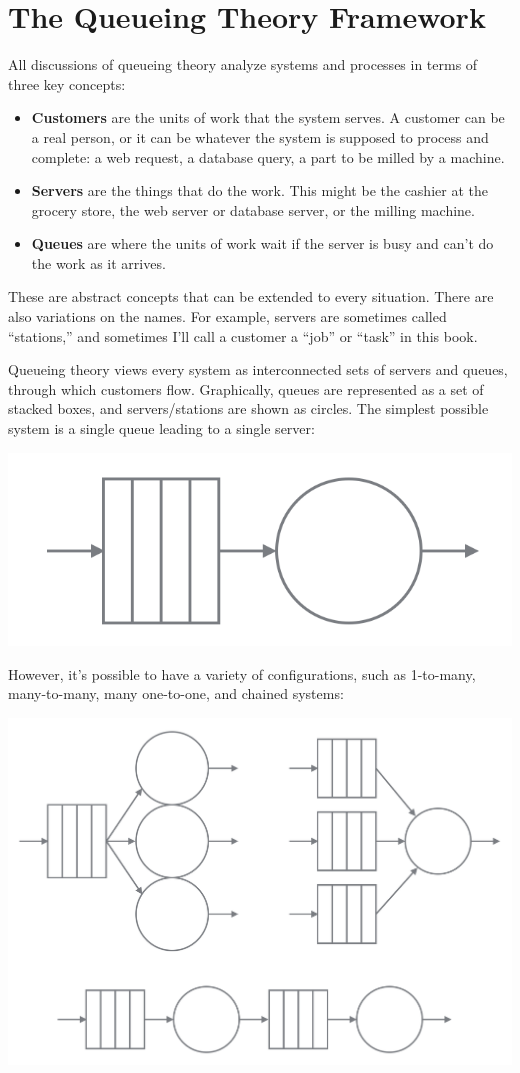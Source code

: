 \documentclass{vivid_layout}
\begin{document}
\section{The Queueing Theory Framework}

All discussions of queueing theory analyze systems and processes in terms of three key concepts:

\begin{itemize}
\item {\bfseries Customers} are the units of work that the system serves. A customer can be a real person, or it can be whatever the system is supposed to process and complete: a web request, a database query, a part to be milled by a machine.
\item {\bfseries Servers} are the things that do the work. This might be the cashier at the grocery store, the web server or database server, or the milling machine.
\item {\bfseries Queues} are where the units of work wait if the server is busy and can't do the work as it arrives.
\end{itemize}

These are abstract concepts that can be extended to every situation. There are also variations on the names. For example, servers are sometimes called ``stations,'' and sometimes I'll call a customer a ``job'' or ``task'' in this book.

Queueing theory views every system as interconnected sets of servers and queues, through which customers flow. Graphically, queues are represented as a set of stacked boxes, and servers/stations are shown as circles.  The simplest possible system is a single queue leading to a single server:

\begin{center}
\includegraphics[width=.375\linewidth]{queueing-theory/queue-and-server}
\end{center}

However, it's possible to have a variety of configurations, such as 1-to-many, many-to-many, many one-to-one, and chained systems:

\begin{center}
\includegraphics[width=.75\linewidth]{queueing-theory/queue-configurations}
\end{center}
\end{document}
